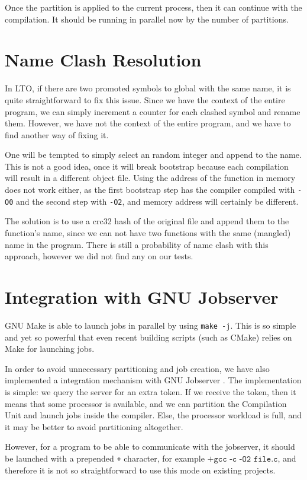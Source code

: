 \documentclass[runningheads]{llncs}
\begin{document}
Once the partition is applied to the current process, then it can
continue with the compilation. It should be running in parallel
now by the number of partitions.

\section{Name Clash Resolution}

In LTO, if there are two promoted symbols to global with the same name, it is
quite straightforward to fix this issue. Since we have the context of the
entire program, we can simply increment a counter for each clashed symbol and
rename them. However, we have not the context of the entire program, and we
have to find another way of fixing it.

One will be tempted to simply select an random integer and append to the name.
This is not a good idea, once it will break bootstrap because each
compilation will result in a different object file. Using the address of the
function in memory does not work either, as the first bootstrap step has the
compiler compiled with \texttt{-O0} and the second step with \texttt{-O2}, and
memory address will certainly be different.

The solution is to
use a crc32 hash of the original file and append them to the function's name,
since we can not have two functions with the same (mangled) name in the program.
There is still a probability of name clash with this approach, however we did
not find any on our tests.

\section{Integration with GNU Jobserver}

GNU Make is able to launch jobs in parallel by using \texttt{make -j}. This
is so simple and yet so powerful that even recent building scripts (such as CMake)
relies on Make for launching jobs.

In order to avoid unnecessary partitioning and job creation, we have also
implemented a integration mechanism with GNU Jobserver \cite{posixjobserver}.
The implementation
is simple: we query the server for an extra token. If we receive the token,
then it means that some processor is available, and we can partition the
Compilation Unit and launch jobs inside the compiler. Else, the processor
workload is full, and it may be better to avoid partitioning altogether.

However, for a program to be able to communicate with the jobserver,
it should be launched with a prepended \texttt{+} character,
for example $\texttt{+gcc -c -O2 file.c}$, and therefore it is not
so straightforward to use this mode on existing projects.
\end{document}
